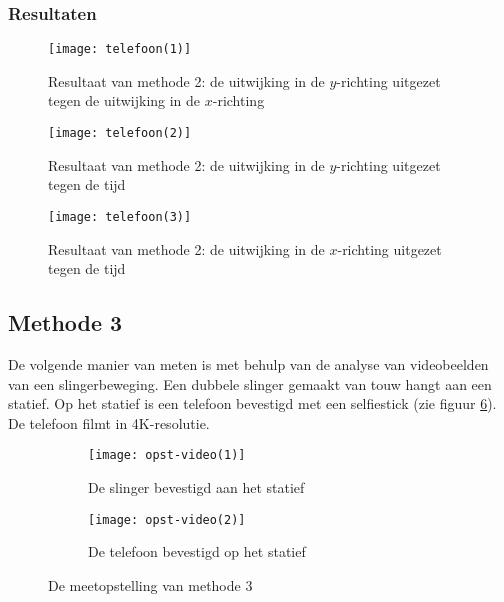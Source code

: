 \documentclass[a4paper]{article}
\begin{document}
	\subsubsection*{Resultaten}
	
	\begin{figure}[!h]
		\centering
		\texttt{[image: telefoon(1)]}
		\caption{Resultaat van methode 2: de uitwijking in de $y$-richting uitgezet tegen de uitwijking in de $x$-richting}
		\label{fig:telefoon(1)}
	\end{figure}
	
	\begin{figure}[!h]
		\centering
		\texttt{[image: telefoon(2)]}
		\caption{Resultaat van methode 2: de uitwijking in de $y$-richting uitgezet tegen de tijd}
		\label{fig:telefoon(2)}
	\end{figure}
	
	\begin{figure}[!h]
		\centering
		\texttt{[image: telefoon(3)]}
		\caption{Resultaat van methode 2: de uitwijking in de $x$-richting uitgezet tegen de tijd}
		\label{fig:telefoon(3)}
	\end{figure}
	\FloatBarrier
	
	\subsection{Methode 3}
	\label{met3}
	De volgende manier van meten is met behulp van de analyse van videobeelden van een slingerbeweging. Een dubbele slinger gemaakt van touw hangt aan een statief. Op het statief is een telefoon bevestigd met een selfiestick (zie figuur \ref{fig:opst-video}). De telefoon filmt in 4K-resolutie.
	
	\begin{figure}[htb]
		\centering
		\begin{subfigure}{.5\textwidth}
			\centering
			\texttt{[image: opst-video(1)]}
			\caption{De slinger bevestigd aan het statief}
			\label{fig:opst-video(1)}
		\end{subfigure}%
		\begin{subfigure}{.5\textwidth}
			\centering
			\texttt{[image: opst-video(2)]}
			\caption{De telefoon bevestigd op het statief}
			\label{fig:opst-video(2)}
		\end{subfigure}
		\caption{De meetopstelling van methode 3}
		\label{fig:opst-video}
	\end{figure}
\end{document}
